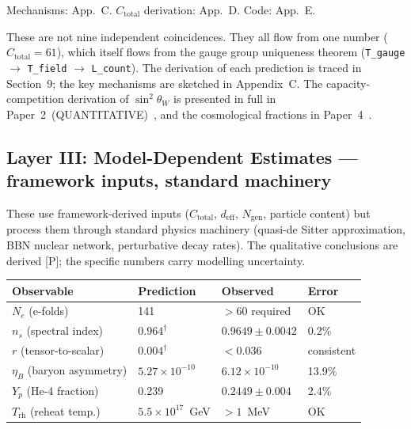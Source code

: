 \documentclass[11pt]{article}
\begin{document}
\noindent Mechanisms: App.~C.  $C_{\mathrm{total}}$ derivation: App.~D.  Code: App.~E.

These are not nine independent coincidences.  They all flow from one number ($C_{\mathrm{total}} = 61$), which itself flows from the gauge group uniqueness theorem (\texttt{T\_gauge} $\to$ \texttt{T\_field} $\to$ \texttt{L\_count}).  The derivation of each prediction is traced in Section~9; the key mechanisms are sketched in Appendix~C.  The capacity-competition derivation of $\sin^2\!\theta_W$ is presented in full in Paper~2~(QUANTITATIVE)~\cite{P2Q}, and the cosmological fractions in Paper~4~\cite{P4}.


\subsection{Layer III: Model-Dependent Estimates --- framework inputs, standard machinery}

These use framework-derived inputs ($C_{\mathrm{total}}$, $d_{\mathrm{eff}}$, $N_{\mathrm{gen}}$, particle content) but process them through standard physics machinery (quasi-de Sitter approximation, BBN nuclear network, perturbative decay rates).  The qualitative conclusions are derived [P]; the specific numbers carry modelling uncertainty.

\smallskip
\begin{center}
\small
\begin{tabular}{llll}
\toprule
\textbf{Observable} & \textbf{Prediction} & \textbf{Observed} & \textbf{Error} \\
\midrule
$N_e$ (e-folds) & 141 & ${>}60$ required & OK \\
$n_s$ (spectral index) & $0.964^\dagger$ & $0.9649 \pm 0.0042$ & 0.2\% \\
$r$ (tensor-to-scalar) & $0.004^\dagger$ & ${<}0.036$ & consistent \\
$\eta_B$ (baryon asymmetry) & $5.27 \times 10^{-10}$ & $6.12 \times 10^{-10}$ & 13.9\% \\
$Y_p$ (He-4 fraction) & 0.239 & $0.2449 \pm 0.004$ & 2.4\% \\
$T_{\mathrm{rh}}$ (reheat temp.) & $5.5 \times 10^{17}$~GeV & ${>}1$~MeV & OK \\
\bottomrule
\end{tabular}
\end{center}
\smallskip

\end{document}
